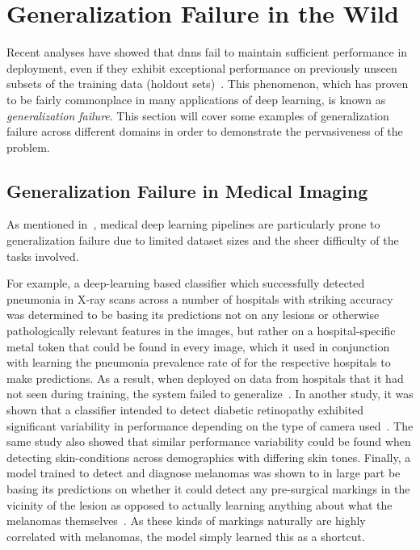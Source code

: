 \section{Generalization Failure in the Wild} \label{case_studies}
    Recent analyses have showed that \glspl{dnn} fail to maintain sufficient performance in deployment, even if they exhibit exceptional performance on previously unseen subsets of the training data (holdout sets)~\cite{damour2020underspecification, endocv2021, shortcut_learning}. This phenomenon, which has proven to be fairly commonplace in many applications of deep learning, is known as \textit{generalization failure}. This section will cover some examples of generalization failure across different domains in order to demonstrate the pervasiveness of the problem.
    
	\subsection{Generalization Failure in Medical Imaging} \label{gen_failure_med}
	As mentioned in~, medical deep learning pipelines are particularly prone to generalization failure due to limited dataset sizes and the sheer difficulty of the tasks involved.
	
	For example, a deep-learning based classifier which successfully detected pneumonia in X-ray scans across a number of hospitals with striking accuracy was determined to be basing its predictions not on any lesions or otherwise pathologically relevant features in the images, but rather on a hospital-specific metal token that could be found in every image, which it used in conjunction with learning the pneumonia prevalence rate of for the respective hospitals to make predictions. As a result, when deployed on data from hospitals that it had not seen during training, the system failed to generalize~\cite{pneumonia}. In another study, it was shown that a classifier intended to detect diabetic retinopathy exhibited significant variability in performance depending on the type of camera used~\cite{damour2020underspecification}. The same study also showed that similar performance variability could be found when detecting skin-conditions across demographics with differing skin tones. Finally, a model trained to detect and diagnose melanomas  was shown to in large part be basing its predictions on whether it could detect any pre-surgical markings in the vicinity of the lesion as opposed to actually learning anything about what the melanomas themselves~\cite{skin_shortcut}. As these kinds of markings naturally are highly correlated with melanomas, the model simply learned this as a shortcut. 
	
